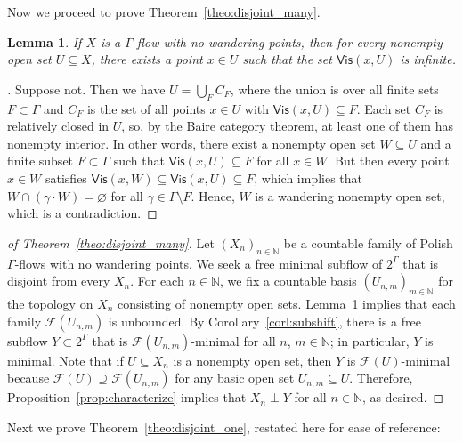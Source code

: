 \documentclass[11pt,reqno,psamsfonts]{amsart}
\theoremstyle{bfnote}
\newtheorem{lemma}[theo]{Lemma}
\theoremstyle{definition}
\theoremstyle{remark}
\newcommand{\0}{\varnothing}
\newcommand{\G}{\Gamma}
\newcommand{\N}{\mathbb{N}}
\newcommand{\Vis}{\mathsf{Vis}}
\numberwithin{equation}{section}
\newenvironment{scproof}[1][]{\begin{proof}[\textsc{\upshape{Proof}}#1]}{\end{proof}}
\begin{document}
    Now we proceed to prove Theorem~\ref{theo:disjoint_many}. %

    \begin{lemma}\label{lemma:recurrent}
        If $X$ is a %
        $\G$-flow with no wandering points, then for every nonempty open set $U \subseteq X$, there exists a point $x \in U$ such that the set $\Vis(x,U)$ is infinite.
    \end{lemma}
    \begin{scproof}
        Suppose not. Then we have $U = \bigcup_{F} C_F$, where the union is over all finite sets $F \subset \G$ and $C_F$ is the set of all points $x \in U$ with $\Vis(x,U) \subseteq F$. Each set $C_F$ is relatively closed in $U$, so, by the Baire category theorem, at least one of them has nonempty interior. In other words, there exist a nonempty open set $W \subseteq U$ and a finite subset $F \subset \G$ such that $\Vis(x,U) \subseteq F$ for all $x \in W$. But then every point $x \in W$ satisfies $\Vis(x,W) \subseteq \Vis(x,U) \subseteq F$, which implies that $W \cap (\gamma \cdot W) = \0$ for all $\gamma \in \G \setminus F$. Hence, $W$ is a wandering nonempty open set, which is a contradiction.
    \end{scproof}


    \begin{scproof}[ of Theorem~\ref{theo:disjoint_many}]
        Let $(X_n)_{n \in \N}$ be a countable family of Polish $\G$-flows with no wandering points. We seek a free minimal subflow of $2^\G$ that is disjoint from every $X_n$. For each $n \in \N$, we fix a countable basis $(U_{n,m})_{m \in \N}$ for the topology on $X_n$ consisting of nonempty open sets. Lemma~\ref{lemma:recurrent} implies that each family $\mathcal{F}(U_{n,m})$ is unbounded. By Corollary~\ref{corl:subshift}, there is a free subflow $Y \subset 2^\G$ that is $\mathcal{F}(U_{n,m})$-minimal for all $n$, $m \in \N$; in particular, $Y$ is minimal. Note that if $U \subseteq X_n$ is a nonempty open set, then $Y$ is $\mathcal{F}(U)$-minimal because $\mathcal{F}(U) \supseteq \mathcal{F}(U_{n,m})$ for any basic open set $U_{n,m} \subseteq U$. Therefore, Proposition~\ref{prop:characterize} implies that $X_n \perp Y$ for all $n \in \N$, as desired.
    \end{scproof}

    
    
    
    Next we prove Theorem~\ref{theo:disjoint_one}, restated here for ease of reference:
\end{document}
